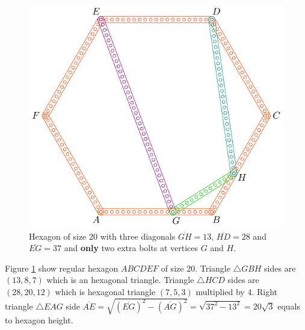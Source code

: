 \documentclass[11pt]{article}
\begin{document}
\begin{figure}[H]
\centering
\includegraphics[scale=1]{20/hexa-20a}
\caption{Hexagon of size $20$ with three diagonals $\overline{GH} = 13$, $\overline{HD} = 28$ and $\overline{EG} = 37$ and \textbf{only} two extra bolts at vertices $G$ and $H$.}
\label{fig:20a}
\end{figure}

Figure \ref{fig:20a} show regular hexagon $ABCDEF$ of size $20$. Triangle $\triangle{GBH}$ sides are $(13,8,7)$ which is an hexagonal triangle. Triangle $\triangle{HCD}$ sides are $(28,20,12)$ which is hexagonal triangle $(7,5,3)$ multiplied by $4$. Right triangle $\triangle{EAG}$ side $\overline{AE} = \sqrt{(\overline{EG})^2 - (\overline{AG})^2} = \sqrt{37^2 - 13^2} = 20\sqrt3$ equals to hexagon height.
\end{document}
